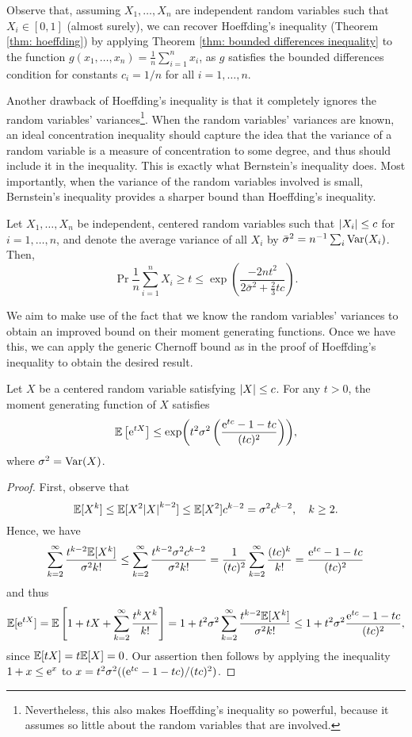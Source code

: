 Observe that, assuming $X_1, \dots, X_n$ are independent random variables such that $X_i \in [0, 1]$ (almost surely), we can recover Hoeffding's inequality (Theorem \ref{thm: hoeffding}) by applying Theorem \ref{thm: bounded differences inequality} to the function $g(x_1, \dots, x_n) = \frac{1}{n} \sum_{i=1}^n x_i$, as $g$ satisfies the bounded differences condition for constants $c_i = 1/n$ for all $i = 1, \dots, n$.

Another drawback of Hoeffding's inequality is that it completely ignores the random variables' variances\footnote{Nevertheless, this also makes Hoeffding's inequality so powerful, because it assumes so little about the random variables that are involved.}. When the random variables' variances are known, an ideal concentration inequality should capture the idea that the variance of a random variable is a measure of concentration to some degree, and thus should include it in the inequality. This is exactly what Bernstein's inequality does. Most importantly, when the variance of the random variables involved is small, Bernstein's inequality provides a sharper bound than Hoeffding's inequality.

\begin{theorem}
\label{thm: bernstein}
Let $X_1, \dots, X_n$ be independent, centered random variables such that $\abs{X_i} \leq c$ for $i = 1, \dots, n$, and denote the average variance of all $X_i$ by $\bar\sigma^2 = n^{-1} \sum_i \mathrm{Var}(X_i)$. Then,
\[
    \Pr{\frac{1}{n} \sum_{i=1}^n X_i \geq t} \leq \exp(\frac{-2nt^2}{2\bar\sigma^2 + \frac{2}{3}tc}).
\]
\end{theorem}

We aim to make use of the fact that we know the random variables' variances to obtain an improved bound on their moment generating functions. Once we have this, we can apply the generic Chernoff bound as in the proof of Hoeffding's inequality to obtain the desired result.

\begin{lemma}
\label{lem: bernstein}
Let $X$ be a centered random variable satisfying $\abs{X} \leq c$. For any $t > 0$, the moment generating function of $X$ satisfies
\[
    \mathbb{E}\left[\mathrm{e}^{tX}\right] \leq \exp( t^2 \sigma^2 \left( \frac{\mathrm{e}^{tc} - 1 - tc}{(tc)^2} \right) ),
\]
where $\sigma^2 = \mathrm{Var}(X)$.
\end{lemma}

\begin{proof}
First, observe that
\[
    \mathbb{E}[X^k] \leq \mathbb{E}[X^2 \abs{X}^{k-2}] \leq \mathbb{E}[X^2] c^{k-2} = \sigma^2 c^{k-2}, \quad k \geq 2.
\]
Hence, we have
\[
    \sum_{k=2}^\infty \frac{t^{k-2} \mathbb{E}[X^k]}{\sigma^2 k!} \leq \sum_{k=2}^\infty \frac{t^{k-2} \sigma^2 c^{k-2}}{\sigma^2 k!} = \frac{1}{(tc)^2} \sum_{k=2}^\infty \frac{(tc)^k}{k!} = \frac{\mathrm{e}^{tc} - 1 - tc}{(tc)^2}
\]
and thus
\[
    \mathbb{E}[\mathrm{e}^{tX}] = \mathbb{E}\left[1 + tX + \sum_{k=2}^\infty \frac{t^k X^k}{k!}\right] = 1 + t^2 \sigma^2 \sum_{k=2}^\infty \frac{t^{k-2} \mathbb{E}[X^k]}{\sigma^2 k!} \leq 1 + t^2 \sigma^2 \frac{\mathrm{e}^{tc} - 1 - tc}{(tc)^2},
\]
since $\mathbb{E}[tX] = t \mathbb{E}[X] = 0$. Our assertion then follows by applying the inequality $1 + x \leq \mathrm{e}^x$ to $x = t^2 \sigma^2 ((\mathrm{e}^{tc} - 1 - tc)/(tc)^2)$.
\end{proof}

